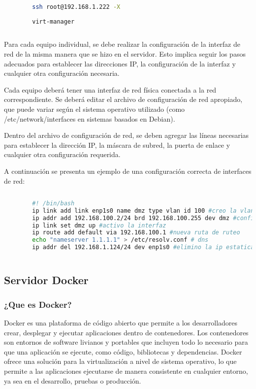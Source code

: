 		\begin{lstlisting}[language=Bash, caption=ssh]
		
		ssh root@192.168.1.222 -X
		
		virt-manager
		
		\end{lstlisting}
		
		Para cada equipo individual, se debe realizar la configuración de la interfaz de red de la misma manera que se hizo en el servidor. Esto implica seguir los pasos adecuados para establecer las direcciones IP, la configuración de la interfaz y cualquier otra configuración necesaria.
		
		Cada equipo deberá tener una interfaz de red física conectada a la red correspondiente. Se deberá editar el archivo de configuración de red apropiado, que puede variar según el sistema operativo utilizado (como /etc/network/interfaces en sistemas basados en Debian).
		
		Dentro del archivo de configuración de red, se deben agregar las líneas necesarias para establecer la dirección IP, la máscara de subred, la puerta de enlace y cualquier otra configuración requerida.\par
		
		A continuación se presenta un ejemplo de una configuración correcta de interfaces de red:
		
		\begin{lstlisting}[language=Bash, caption=Configurar Interfaz]
		
		#! /bin/bash
		ip link add link enp1s0 name dmz type vlan id 100 #creo la vlan
		ip addr add 192.168.100.2/24 brd 192.168.100.255 dev dmz #configuro la ip
		ip link set dmz up #activo la interfaz
		ip route add default via 192.168.100.1 #nueva ruta de ruteo
		echo "nameserver 1.1.1.1" > /etc/resolv.conf # dns
		ip addr del 192.168.1.124/24 dev enp1s0 #elimino la ip estatica anterio
		
		\end{lstlisting}
	
		\subsection{Servidor Docker}
		
			\subsubsection{¿Que es Docker?}
	
				Docker es una plataforma de código abierto que permite a los desarrolladores crear, desplegar y ejecutar aplicaciones dentro de contenedores. Los contenedores son entornos de software livianos y portables que incluyen todo lo necesario para que una aplicación se ejecute, como código, bibliotecas y dependencias. Docker ofrece una solución para la virtualización a nivel de sistema operativo, lo que permite a las aplicaciones ejecutarse de manera consistente en cualquier entorno, ya sea en el desarrollo, pruebas o producción.
		
